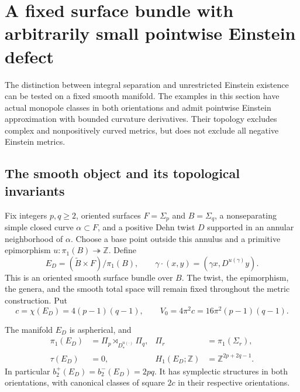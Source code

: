 \section{A fixed surface bundle with arbitrarily small pointwise Einstein defect}
\label{sec:fixed-bundle-geometry}

The distinction between integral separation and unrestricted Einstein
existence can be tested on a fixed smooth manifold.  The examples in this
section have actual monopole classes in both orientations and admit
pointwise Einstein approximation with bounded curvature derivatives.
Their topology excludes complex and nonpositively curved metrics, but
does not exclude all negative Einstein metrics.

\subsection{The smooth object and its topological invariants}

Fix integers $p,q\ge2$, oriented surfaces $F=\Sigma_p$ and $B=\Sigma_q$,
a nonseparating simple closed curve $\alpha\subset F$, and a positive
Dehn twist $D$ supported in an annular neighborhood of $\alpha$.
Choose a base point outside this annulus and a primitive epimorphism
$u:\pi_1(B)\twoheadrightarrow\mathbb Z$.  Define
\begin{equation}\label{eq:fixed-bundle-object}
 E_D=(\widetilde B\times F)/\pi_1(B),\qquad
 \gamma\cdot(x,y)=(\gamma x,D^{u(\gamma)}y).
\end{equation}
This is an oriented smooth surface bundle over $B$.  The twist, the
epimorphism, the genera, and the smooth total space will remain fixed
throughout the metric construction.  Put
\begin{equation}\label{eq:fixed-bundle-volume}
 c=\chi(E_D)=4(p-1)(q-1),\qquad
 V_0=4\pi^2c=16\pi^2(p-1)(q-1).
\end{equation}

\begin{proposition}\label{prop:fixed-bundle-topology}
The manifold $E_D$ is aspherical, and
\begin{align}
 \pi_1(E_D)&=\Pi_p\rtimes_{D_*^{u(\cdot)}}\Pi_q,
       &\Pi_r&=\pi_1(\Sigma_r),\label{eq:fixed-bundle-group}\\
 \tau(E_D)&=0,
       &H_1(E_D;\mathbb Z)&=\mathbb Z^{2p+2q-1}.
       \label{eq:fixed-bundle-invariants}
\end{align}
In particular $b_2^+(E_D)=b_2^-(E_D)=2pq$.  It has symplectic
structures in both orientations, with canonical classes of square $2c$
in their respective orientations.
\end{proposition}

